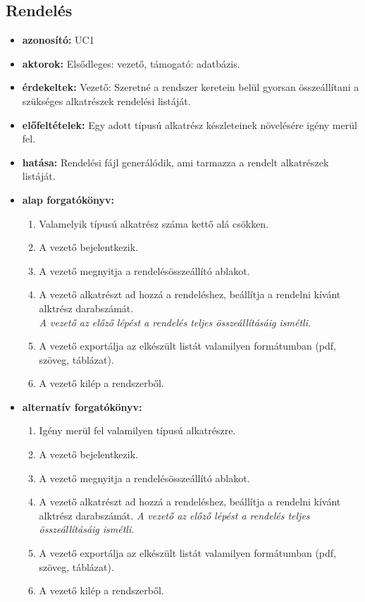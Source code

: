 \documentclass[12pt]{article}\usepackage[left=20mm,right=20mm,top=15mm,bottom=20mm]{geometry}
\begin{document}
\subsection{Rendelés}
\begin{itemize}
\item[] \textbf{azonosító: } UC1

\item[] \textbf{aktorok: } Elsődleges: vezető, támogató: adatbázis.  

\item[] \textbf{érdekeltek: } Vezető: Szeretné a rendszer keretein belül gyorsan összeállítani a szükséges alkatrészek rendelési listáját.

\item[] \textbf{előfeltételek: } Egy adott típusú alkatrész készleteinek növelésére igény merül fel.

\item[] \textbf{hatása: } Rendelési fájl generálódik, ami tarmazza a rendelt alkatrészek listáját.

\item[] \textbf{alap forgatókönyv: }
\begin{enumerate}
\item Valamelyik típusú alkatrész száma kettő alá csökken.
\item A vezető bejelentkezik.
\item A vezető megnyitja a rendelésösszeállító ablakot.
\item A vezető alkatrészt ad hozzá a rendeléshez, beállítja a rendelni kívánt alktrész darabszámát. \\
\textit{A vezető az előző lépést a rendelés teljes összeállításáig ismétli.}
\item A vezető exportálja az elkészült listát valamilyen formátumban (pdf, szöveg, táblázat).
\item A vezető kilép a rendszerből.
\end{enumerate}

\item[] \textbf{alternatív forgatókönyv: }
\begin{enumerate}
\item Igény merül fel valamilyen típusú alkatrészre.
\item A vezető bejelentkezik.
\item A vezető megnyitja a rendelésösszeállító ablakot.
\item A vezető alkatrészt ad hozzá a rendeléshez, beállítja a rendelni kívánt alktrész darabszámát.
\textit{A vezető az előző lépést a rendelés teljes összeállításáig ismétli.}
\item A vezető exportálja az elkészült listát valamilyen formátumban (pdf, szöveg, táblázat).
\item A vezető kilép a rendszerből.
\end{enumerate}


\end{itemize}
\end{document}
